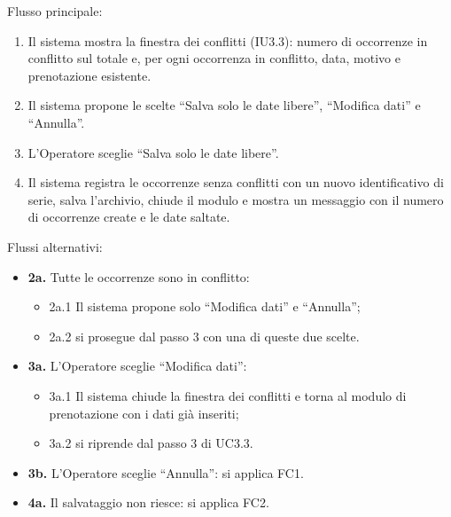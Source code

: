 \noindent Flusso principale:
\begin{enumerate}
\item Il sistema mostra la finestra dei conflitti (IU3.3): numero di occorrenze in conflitto sul totale e, per ogni occorrenza in conflitto, data, motivo e prenotazione esistente.
\item Il sistema propone le scelte ``Salva solo le date libere'', ``Modifica dati'' e ``Annulla''.
\item L'Operatore sceglie ``Salva solo le date libere''.
\item Il sistema registra le occorrenze senza conflitti con un nuovo identificativo di serie, salva l'archivio, chiude il modulo e mostra un messaggio con il numero di occorrenze create e le date saltate.
\end{enumerate}
\noindent Flussi alternativi:
\begin{itemize}
\item \textbf{2a.} Tutte le occorrenze sono in conflitto:
\begin{itemize}
\item 2a.1 Il sistema propone solo ``Modifica dati'' e ``Annulla'';
\item 2a.2 si prosegue dal passo 3 con una di queste due scelte.
\end{itemize}
\item \textbf{3a.} L'Operatore sceglie ``Modifica dati'':
\begin{itemize}
\item 3a.1 Il sistema chiude la finestra dei conflitti e torna al modulo di prenotazione con i dati già inseriti;
\item 3a.2 si riprende dal passo 3 di UC3.3.
\end{itemize}
\item \textbf{3b.} L'Operatore sceglie ``Annulla'': si applica FC1.
\item \textbf{4a.} Il salvataggio non riesce: si applica FC2.
\end{itemize}
